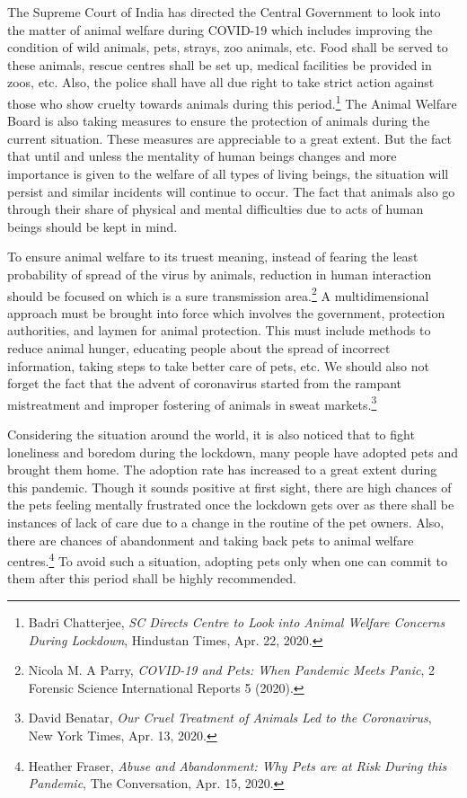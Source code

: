 \begin{multicols}{2}
\noi
The Supreme Court of India has directed the Central Government to look into the matter of
animal welfare during COVID-19 which includes improving the condition of wild animals,
pets, strays, zoo animals, etc. Food shall be served to these animals, rescue centres shall be
set up, medical facilities be provided in zoos, etc. Also, the police shall have all due right to
take strict action against those who show cruelty towards animals during this period.\footnote{Badri Chatterjee, \textit{SC Directs Centre to Look into Animal Welfare Concerns During Lockdown}, Hindustan Times, Apr. 22, 2020.} The
Animal Welfare Board is also taking measures to ensure the protection of animals during the
current situation. These measures are appreciable to a great extent. But the fact that until and
unless the mentality of human beings changes and more importance is given to the welfare of
all types of living beings, the situation will persist and similar incidents will continue to
occur. The fact that animals also go through their share of physical and mental difficulties
due to acts of human beings should be kept in mind.

\vspace{.1cm}

\noi
To ensure animal welfare to its truest meaning, instead of fearing the least probability of
spread of the virus by animals, reduction in human interaction should be focused on which is
a sure transmission area.\footnote{Nicola M. A Parry, \textit{COVID-19 and Pets: When Pandemic Meets Panic}, 2 Forensic Science International
Reports 5 (2020).} A multidimensional approach must be brought into force which
involves the government, protection authorities, and laymen for animal protection. This must
include methods to reduce animal hunger, educating people about the spread of incorrect
information, taking steps to take better care of pets, etc. We should also not forget the fact
that the advent of coronavirus started from the rampant mistreatment and improper fostering
of animals in sweat markets.\footnote{David Benatar, \textit{Our Cruel Treatment of Animals Led to the Coronavirus}, New York Times, Apr. 13, 2020.}

\vspace{.1cm}

\noi
Considering the situation around the world, it is also noticed that to fight loneliness and
boredom during the lockdown, many people have adopted pets and brought them home. The
adoption rate has increased to a great extent during this pandemic. Though it sounds positive at first sight, there are high chances of the pets feeling mentally frustrated once the lockdown
gets over as there shall be instances of lack of care due to a change in the routine of the pet
owners. Also, there are chances of abandonment and taking back pets to animal welfare
centres.\footnote{Heather Fraser, \textit{Abuse and Abandonment: Why Pets are at Risk During this Pandemic}, The Conversation, Apr.
15, 2020.} To avoid such a situation, adopting pets only when one can commit to them after
this period shall be highly recommended.


\end{multicols}
